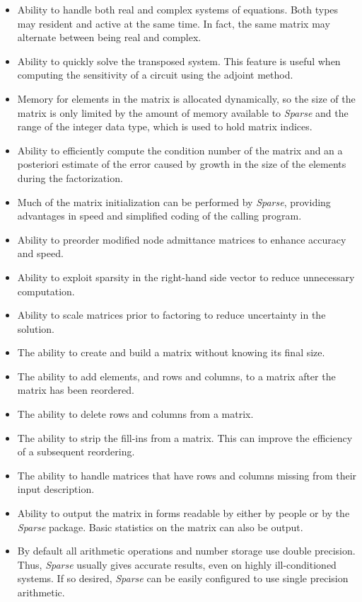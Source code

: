 \documentclass[11pt]{article}
\begin{document}
\begin{itemize}
    \item
	Ability to handle both real and complex systems of equations.  Both types
	may resident and active at the same time.  In fact, the same matrix
	may alternate between being real and complex.
    \item
	Ability to quickly solve the transposed system.  This feature is useful
	when computing the sensitivity of a circuit using the adjoint method.
    \item
	Memory for elements in the matrix is allocated dynamically, so the
	size of the matrix is only limited by the amount of memory available
	to \emph{Sparse} and the range of the integer data type, which is used to
	hold matrix indices.
    \item
	Ability to efficiently compute the condition number of the matrix and
	an a posteriori estimate of the error caused by growth in the size of
	the elements during the factorization.
    \item
	Much of the matrix initialization can be performed by \emph{Sparse},
	providing advantages in speed and simplified coding of the calling
	program.
    \item
	Ability to preorder modified node admittance matrices to enhance 
	accuracy and speed.
    \item
	Ability to exploit sparsity in the right-hand side vector to 
	reduce unnecessary computation.
    \item
	Ability to scale matrices prior to factoring to reduce uncertainty 
	in the solution.
    \item
	The ability to create and build a matrix without knowing its final size.
    \item
	The ability to add elements, and rows and columns,
	to a matrix after the matrix has been reordered.  
    \item
	The ability to delete rows and columns from a matrix.  
    \item
	The ability to strip the fill-ins from a matrix.  This can improve the
	efficiency of a subsequent reordering.
    \item
	The ability to handle matrices that have rows and columns missing from
	their input description.  
    \item
	Ability to output the matrix in forms readable by either by people or
	by the \emph{Sparse} package.  Basic statistics on the matrix can also be
	output.
    \item
	By default all arithmetic operations and number storage use double precision.
	Thus, \emph{Sparse} usually gives accurate results, even on highly
	ill-conditioned systems.  If so desired, \emph{Sparse} can be easily
	configured to use single precision arithmetic.
\end{itemize}
\end{document}
